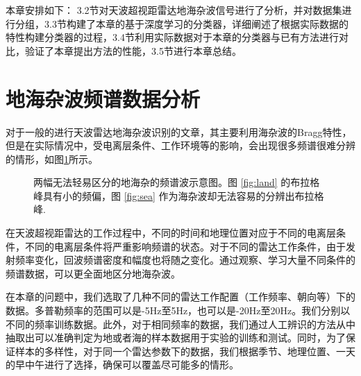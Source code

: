 本章安排如下： 3.2节对天波超视距雷达地海杂波信号进行了分析，并对数据集进行分组，3.3节构建了本章的基于深度学习的分类器，详细阐述了根据实际数据的特性构建分类器的过程，3.4节利用实际数据对于本章的分类器与已有方法进行对比，验证了本章提出方法的性能，3.5节进行本章总结。

\section{地海杂波频谱数据分析}
对于一般的进行天波雷达地海杂波识别的文章，其主要利用海杂波的Bragg特性，但是在实际情况中，受电离层条件、工作环境等的影响，会出现很多频谱很难分辨的情形，如图\ref{fig:spectrum}所示。
\begin{figure}[H]
	\centering
	\hfil
	\caption{两幅无法轻易区分的地海杂的频谱波示意图。图 \ref{fig:land} 的布拉格峰具有小的频偏，图 \ref{fig:sea} 作为海杂波却无法容易的分辨出布拉格峰.}
	\label{fig:spectrum}
\end{figure}
在天波超视距雷达的工作过程中，不同的时间和地理位置对应于不同的电离层条件，不同的电离层条件将严重影响频谱的状态。对于不同的雷达工作条件，由于发射频率变化，回波频谱密度和幅度也将随之变化。通过观察、学习大量不同条件的频谱数据，可以更全面地区分地海杂波。

在本章的问题中，我们选取了几种不同的雷达工作配置（工作频率、朝向等）下的数据。多普勒频率的范围可以是-5Hz至5Hz，也可以是-20Hz至20Hz。我们分别以不同的频率训练数据。此外，对于相同频率的数据，我们通过人工辨识的方法从中抽取出可以准确判定为地或者海的样本数据用于实验的训练和测试。同时，为了保证样本的多样性，对于同一个雷达参数下的数据，我们根据季节、地理位置、一天的早中午进行了选择，确保可以覆盖尽可能多的情形。

